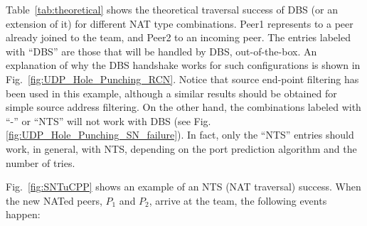 Table~\ref{tab:theoretical} shows the theoretical traversal success of
DBS (or an extension of it) for different NAT type combinations. Peer1
represents to a peer already joined to the team, and Peer2 to an
incoming peer. The entries labeled with ``DBS'' are those that will be
handled by DBS, out-of-the-box. An explanation of why the DBS
handshake works for such configurations is shown in
Fig.~\ref{fig:UDP_Hole_Punching_RCN}.  Notice that source end-point
filtering has been used in this example, although a similar results
should be obtained for simple source address filtering. On the other
hand, the combinations labeled with ``-'' or ``NTS'' will not work
with DBS (see Fig.\ref{fig:UDP_Hole_Punching_SN_failure}). In fact,
only the ``NTS'' entries should work, in general, with NTS, depending
on the port prediction algorithm and the number of
tries.

Fig.~\ref{fig:SNTuCPP} shows an example of an NTS (NAT traversal)
success. When the new NATed peers, $P_1$ and $P_2$, arrive at the
team,
the following events happen:

